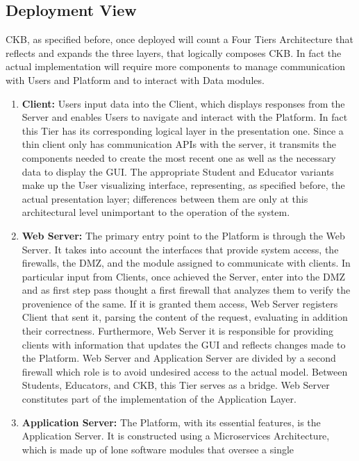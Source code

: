 \subsection{Deployment View}
CKB, as specified before, once deployed will count a Four Tiers Architecture that reflects and expands the three layers, that logically composes CKB.
In fact the actual implementation will require more components to manage communication with Users and Platform and to interact with Data modules.
\begin{enumerate}[label=$\bullet$]
    \item \textbf{Client:} Users input data into the Client, which displays responses from the Server and enables Users to navigate and interact with the Platform. In fact this Tier has its corresponding logical layer in the presentation one. 
    Since a thin client only has communication APIs with the server, it transmits the components needed to create the most recent one as well as the necessary data to display the GUI.
    The appropriate Student and Educator variants make up the User visualizing interface, representing, as specified before, the actual presentation layer; differences between them 
    are only at this architectural level unimportant to the operation of the system.
    \item \textbf{Web Server:} The primary entry point to the Platform is through the Web Server. It takes into account the interfaces that provide system access, the firewalls, the DMZ, and the module assigned to communicate with 
    clients. In particular input from Clients, once achieved the Server, enter into the DMZ and as first step pass thought a first firewall that analyzes them to verify the provenience of the same. If it is granted them access, Web Server registers Client that sent it, parsing the content of the request, evaluating in addition their correctness. 
    Furthermore, Web Server it is responsible for providing clients with information that updates the GUI and reflects changes made to the Platform. Web Server and Application Server are divided by a second firewall which role is to avoid undesired access to the actual model. Between Students, Educators, 
    and CKB, this Tier serves as a bridge. Web Server constitutes part of the implementation of the Application Layer.
    \item \textbf{Application Server:} The Platform, with its essential features, is the Application Server. It is constructed using a Microservices Architecture, which is made up of lone software modules that oversee a single 

\end{enumerate}
